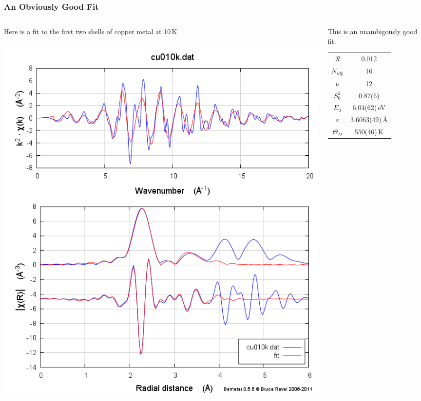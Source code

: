 \documentclass[10pt, xcolor=x11names, compress]{beamer}
\begin{document}
\begin{frame}
  \frametitle{An Obviously Good Fit}
  \begin{columns}[T]
    \begin{column}{0.4\linewidth}
      \begin{block}{}
        \begin{center}
          Here is a fit to the first two shells of copper metal at
          10\,K
        \end{center}
      \end{block}
      \includegraphics[width=\linewidth]{info/cufit.png}      
    \end{column}
    \begin{column}{0.6\linewidth}
      \begin{center}
        This is an unambigously good fit:
        
        \medskip

        \begin{tabular}{cc}
          $\mathcal{R}$ & 0.012 \\
          $N_{idp}$     & 16 \\
          $\nu$         & 12\\[1.5ex]
          $S_0^2$       & 0.87(6) \\
          $E_0$         & 6.04(62)\,eV \\
          $a$           & 3.6063(49)\,\AA \\
          $\Theta_D$    & 550(46)\,K \\
        \end{tabular}


\end{center}
\end{column}
\end{columns}
\end{frame}
\end{document}
